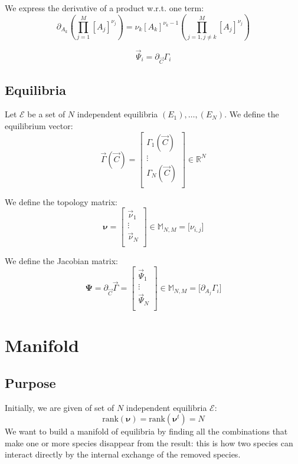 \documentclass[aps,12pt]{revtex4}
\begin{document}
We express the derivative of a product w.r.t. one term:
\begin{equation}
	\partial_{A_k} \left( \prod_{j=1}^{M} [A_j]^{\nu_{j}} \right)  =
	\nu_k [A_k]^{\nu_k-1} \left( \prod_{j=1,j\not=k}^{M} [A_j]^{\nu_{j}} \right)
\end{equation}
 
\begin{equation}
	\vec{\Psi}_i = \partial_{\vec{C}} \Gamma_i
\end{equation}


\subsection{Equilibria}
Let $\mathcal{E}$ be a set of $N$ independent equilibria $(E_1),\dots,(E_N)$.
We define the equilibrium vector:
\begin{equation}
	\vec{\Gamma}(\vec{C}) =
	\begin{bmatrix}
	\Gamma_1(\vec{C})\\
	\vdots\\
	\Gamma_N(\vec{C})\\
	\end{bmatrix}
	\in \mathbb{R}^N
\end{equation}

We define the topology matrix:
\begin{equation}
	\bm{\nu} = 
	\begin{bmatrix}
	\vec{\nu}_1\\
	\vdots\\
	\vec{\nu}_N\\
	\end{bmatrix}
	\in \mathbb{M}_{N,M}
	= \lbrack \nu_{i,j} \rbrack
\end{equation}


We define the Jacobian matrix:
\begin{equation}
\bm{\Psi} = \partial_{\vec{C}} \vec{\Gamma} = 
\begin{bmatrix}
	\vec{\Psi}_1\\
	\vdots\\
	\vec{\Psi}_N\\
	\end{bmatrix}
	\in \mathbb{M}_{N,M} = 
	\lbrack \partial_{A_j}\Gamma_i \rbrack
\end{equation}

\section{Manifold}
\subsection{Purpose}
Initially, we are given of set of $N$ independent equilibria $\mathcal{E}$:
\begin{equation}
	\mathrm{rank}(\bm{\nu}) = \mathrm{rank}(\bm{\nu}^t) = N
\end{equation}
We want to build a manifold of equilibria by finding
all the combinations that make one or more species disappear from
the result: this is how two species can interact directly by
the internal exchange of the removed species.
\end{document}
